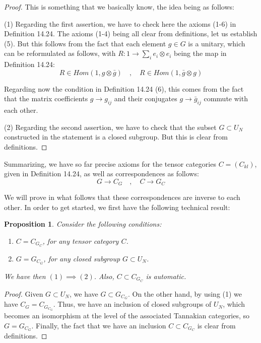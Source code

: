 \documentclass[12pt]{amsbook}
\newtheorem{proposition}[theorem]{Proposition}
\begin{document}
\begin{proof}
This is something that we basically know, the idea being as follows:

\medskip

(1) Regarding the first assertion, we have to check here the axioms (1-6) in Definition 14.24. The axioms (1-4) being all clear from definitions, let us establish (5). But this follows from the fact that each element $g\in G$ is a unitary, which can be reformulated as follows, with $R:1\to\sum_ie_i\otimes e_i$ being the map in Definition 14.24:
$$R\in Hom(1,g\otimes\bar{g})\quad,\quad 
R\in Hom(1,\bar{g}\otimes g)$$

Regarding now the condition in Definition 14.24 (6), this comes from the fact that the matrix coefficients $g\to g_{ij}$ and their conjugates $g\to\bar{g}_{ij}$ commute with each other.

\medskip

(2) Regarding the second assertion, we have to check that the subset $G\subset U_N$ constructed in the statement is a closed subgroup. But this is clear from definitions.
\end{proof}

Summarizing, we have so far precise axioms for the tensor categories $C=(C_{kl})$, given in Definition 14.24, as well as correspondences as follows:
$$G\to C_G\quad,\quad 
C\to G_C$$

We will prove in what follows that these correspondences are inverse to each other. In order to get started, we first have the following technical result:

\begin{proposition}
Consider the following conditions:
\begin{enumerate}
\item $C=C_{G_C}$, for any tensor category $C$.

\item $G=G_{C_G}$, for any closed subgroup $G\subset U_N$.
\end{enumerate}
We have then $(1)\implies(2)$. Also, $C\subset C_{G_C}$ is automatic.
\end{proposition}

\begin{proof}
Given $G\subset U_N$, we have $G\subset G_{C_G}$. On the other hand, by using (1) we have $C_G=C_{G_{C_G}}$. Thus, we have an inclusion of closed subgroups of $U_N$, which becomes an isomorphism at the level of the associated Tannakian categories, so $G=G_{C_G}$. Finally, the fact that we have an inclusion $C\subset C_{G_C}$ is clear from definitions.
\end{proof}
\end{document}
